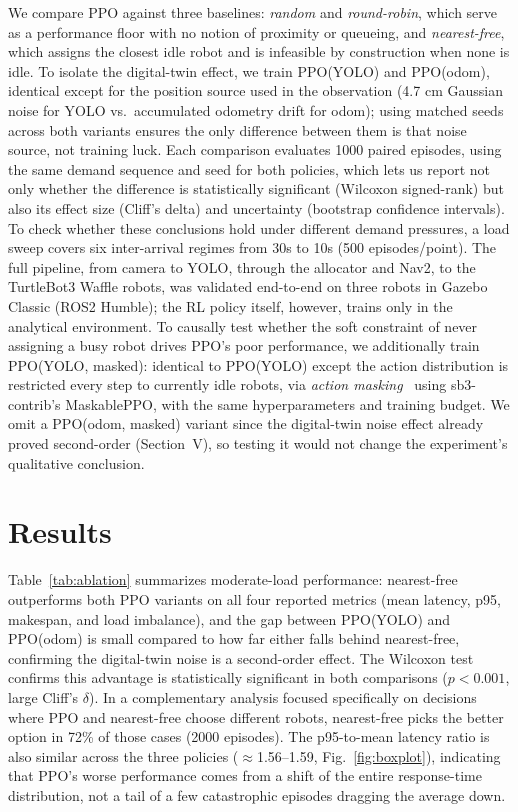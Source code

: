 \documentclass[conference]{IEEEtran}
\begin{document}
We compare PPO against three baselines: \emph{random} and \emph{round-robin}, which serve as a performance floor with no notion of proximity or queueing, and \emph{nearest-free}, which assigns the closest idle robot and is infeasible by construction when none is idle. To isolate the digital-twin effect, we train PPO(YOLO) and PPO(odom), identical except for the position source used in the observation (4.7 cm Gaussian noise for YOLO vs.\ accumulated odometry drift for odom); using matched seeds across both variants ensures the only difference between them is that noise source, not training luck. Each comparison evaluates 1000 paired episodes, using the same demand sequence and seed for both policies, which lets us report not only whether the difference is statistically significant (Wilcoxon signed-rank) but also its effect size (Cliff's delta) and uncertainty (bootstrap confidence intervals). To check whether these conclusions hold under different demand pressures, a load sweep covers six inter-arrival regimes from 30s to 10s (500 episodes/point). The full pipeline, from camera to YOLO, through the allocator and Nav2, to the TurtleBot3 Waffle robots, was validated end-to-end on three robots in Gazebo Classic (ROS2 Humble); the RL policy itself, however, trains only in the analytical environment. To causally test whether the soft constraint of never assigning a busy robot drives PPO's poor performance, we additionally train PPO(YOLO, masked): identical to PPO(YOLO) except the action distribution is restricted every step to currently idle robots, via \textit{action masking}~\cite{huang2022masking} using sb3-contrib's MaskablePPO, with the same hyperparameters and training budget. We omit a PPO(odom, masked) variant since the digital-twin noise effect already proved second-order (Section~V), so testing it would not change the experiment's qualitative conclusion.

\section{Results}

Table~\ref{tab:ablation} summarizes moderate-load performance: nearest-free outperforms both PPO variants on all four reported metrics (mean latency, p95, makespan, and load imbalance), and the gap between PPO(YOLO) and PPO(odom) is small compared to how far either falls behind nearest-free, confirming the digital-twin noise is a second-order effect. The Wilcoxon test confirms this advantage is statistically significant in both comparisons ($p<0.001$, large Cliff's $\delta$). In a complementary analysis focused specifically on decisions where PPO and nearest-free choose different robots, nearest-free picks the better option in 72\% of those cases (2000 episodes). The p95-to-mean latency ratio is also similar across the three policies ($\approx$1.56--1.59, Fig.~\ref{fig:boxplot}), indicating that PPO's worse performance comes from a shift of the entire response-time distribution, not a tail of a few catastrophic episodes dragging the average down.
\end{document}
